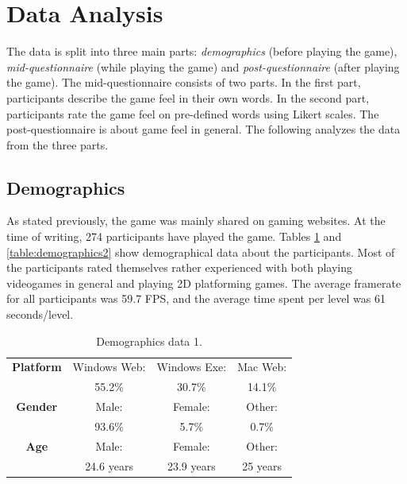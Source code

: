 \section{Data Analysis} \label{data}
The data is split into three main parts: \textit{demographics} (before playing the game), \textit{mid-questionnaire} (while playing the game) and \textit{post-questionnaire} (after playing the game). The mid-questionnaire consists of two parts. In the first part, participants describe the game feel in their own words. In the second part, participants rate the game feel on pre-defined words using Likert scales. The post-questionnaire is about game feel in general. The following analyzes the data from the three parts.

\subsection{Demographics}
As stated previously, the game was mainly shared on gaming websites. At the time of writing, 274 participants have played the game. Tables \ref{table:demographics1} and \ref{table:demographics2} show demographical data about the participants. Most of the participants rated themselves rather experienced with both playing videogames in general and playing 2D platforming games. The average framerate for all participants was 59.7 FPS, and the average time spent per level was 61 seconds/level.

\begin{table} \centering
\small
\caption{Demographics data 1.}
\label{table:demographics1}
\renewcommand{\arraystretch}{1.2}
\begin{tabular}{cccc}
\midrule
\textbf{Platform} & Windows Web: & Windows Exe: & Mac Web: \\
                  & 55.2\%      & 30.7\%      & 14.1\%  \\
\textbf{Gender}   & Male:        & Female:      & Other:   \\
                  & 93.6\%      & 5.7\%       & 0.7\%   \\
\textbf{Age}      & Male:     & Female:            & Other:        \\
                  & 24.6 years  & 23.9 years           & 25 years        \\
\bottomrule
\end{tabular}
\end{table}

